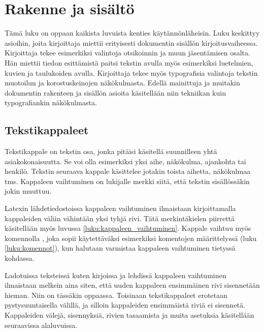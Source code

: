 
\chapter{Rakenne ja sisältö}

Tämä luku on oppaan kaikista luvuista kenties käytännönläheisin. Luku
keskittyy asioihin, joita kirjoittaja miettii erityisesti dokumentin
sisällön kirjoitusvaiheessa. Kirjoittaja tekee esimerkiksi valintoja
otsikoinnin ja muun jäsentämisen osalta. Hän miettii tiedon esittämistä
paitsi tekstin avulla myös esimerkiksi luetelmien, kuvien ja taulukoiden
avulla. Kirjoittaja tekee myös typografisia valintoja tekstin muotoilun
ja korostuskeinojen näkökulmasta. Edellä mainittuja ja muitakin
dokumentin rakenteen ja sisällön asioita käsitellään niin tekniikan kuin
typografiankin näkökulmasta.

\section{Tekstikappaleet}
\label{luku:kappale}

Tekstikappale on tekstin osa, jonka pitäisi käsitellä suunnilleen yhtä
asiakokonaisuutta. Se voi olla esimerkiksi yksi aihe, näkökulma,
ajankohta tai henkilö. Tekstin seuraava kappale käsittelee jotakin
toista aihetta, näkökulmaa tms. Kappaleen vaihtuminen on lukijalle
merkki siitä, että tekstin sisällössäkin jokin muuttuu.

Latexin lähdetiedostoissa kappaleen vaihtuminen ilmaistaan
kirjoittamalla kappaleiden väliin vähintään yksi tyhjä rivi. Tätä
merkintäkielen piirrettä käsitellään myös luvussa
\ref{luku:kappaleen_vaihtuminen}. Kappale vaihtuu myös komennolla
, joka sopii käytettäväksi esimerkiksi komentojen
määrittelyssä (luku \ref{luku:komennot}), kun halutaan varmistaa
kappaleen vaihtuminen tietyssä kohdassa.

Ladotuissa teksteissä kuten kirjoissa ja lehdissä kappaleen vaihtuminen
ilmaistaan melkein aina siten, että uuden kappaleen ensimmäinen rivi
sisennetään hieman. Niin on tässäkin oppaassa. Toisinaan tekstikappaleet
erotetaan pystysuuntaisella välillä, ja silloin kappaleiden ensimmäistä
riviä ei sisennetä. Kappaleiden välejä, sisennyksiä, rivien tasaamista
ja muita asetuksia käsitellään seuraavissa alaluvuissa.

